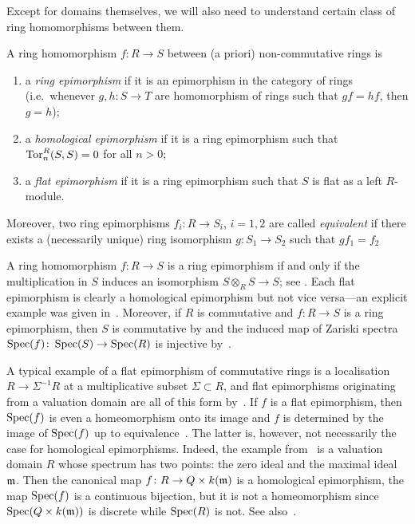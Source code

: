 \documentclass[reqno,a4paper]{amsart}
\begin{document}
Except for domains themselves, we will also need to understand certain class of ring homomorphisms between them.

\begin{definition}
A ring homomorphism $f\colon R\to S$ between (a priori) non-commutative rings is
\begin{enumerate}
\item a \emph{ring epimorphism} if it is an epimorphism in the category of rings (i.e.\ whenever $g,h\colon S\to T$ are homomorphism of rings such that $gf=hf$, then $g=h$);
\item a \emph{homological epimorphism} if it is a ring epimorphism such that $\operatorname{Tor}^R_n(S,S)=0$ for all $n>0$;
\item a \emph{flat epimorphism} if it is a ring epimorphism such that $S$ is flat as a left $R$-module.
\end{enumerate}

Moreover, two ring epimorphisms $f_i\colon R\to S_i$, $i=1,2$ are called \emph{equivalent} if there exists a (necessarily unique) ring isomorphism $g\colon S_1\to S_2$ such that $gf_1=f_2$
\end{definition}

A ring homomorphism $f\colon R\to S$ is a ring epimorphism if and only if the multiplication in $S$ induces an isomorphism $S\otimes_RS\to S$; see \cite[Proposition~1.1]{Silver:1967}. Each flat epimorphism is clearly a homological epimorphism but not vice versa---an explicit example was given in~\cite{keller94}.
Moreover, if $R$ is commutative and $f\colon R\to S$ is a ring epimorphism, then $S$ is commutative by \cite[Corollary~1.2]{Silver:1967} and the induced map of Zariski spectra $\operatorname{Spec}(f)\colon\operatorname{Spec}(S)\to\operatorname{Spec}(R)$ is injective by~\cite[Proposition~IV.1.5]{Lazard:1969}.

A typical example of a flat epimorphism of commutative rings is a localisation $R\to \Sigma^{-1}R$ at a multiplicative subset $\Sigma\subset R$, and flat epimorphisms originating from a valuation domain are all of this form by~\cite[Proposition 5.4]{gldm1}.
If $f$ is a flat epimorphism, then $\operatorname{Spec}(f)$ is even a homeomorphism onto its image and $f$ is determined by the image of $\operatorname{Spec}(f)$ up to equivalence~\cite[Corollaire~IV.2.2]{Lazard:1969}.
The latter is, however, not necessarily the case for homological epimorphisms.
Indeed, the example from~\cite{keller94} is a valuation domain $R$ whose spectrum has two points: the zero ideal and the maximal ideal $\mathfrak{m}$. Then the canonical map $f\colon R\to Q\times k(\mathfrak{m})$ is a homological epimorphism, the map $\operatorname{Spec}(f)$ is a continuous bijection, but it is not a homeomorphism since $\operatorname{Spec}(Q\times k(\mathfrak{m}))$ is discrete while $\operatorname{Spec}(R)$ is not.
See also~\cite[Example~5.24]{gldm1}.
\end{document}
